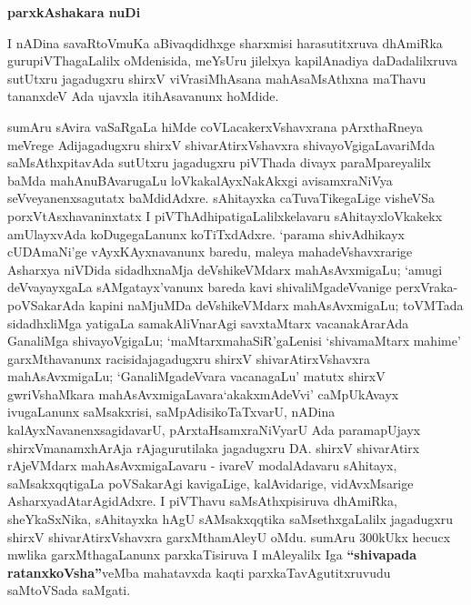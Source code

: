 \begin{center}
{\Huge\bfseries parxkAshakara nuDi}
\end{center}

\smallskip

I nADina savaRtoVmuKa aBivaqdidhxge sharxmisi harasutitxruva dhAmiRka gurupiVThagaLalilx oMdenisida, meYsUru jilelxya kapilA\-nadiya daDadalilxruva sutUtxru jagadugxru shirxV viVrasiMhAsana mahAsaMsAthxna maThavu tananxdeV Ada ujavxla itihAsavanunx hoMdide.

\smallskip

sumAru sAvira vaSaRgaLa hiMde coVLacakerxVshavxrana pArxthaRneya meVrege Adijagadugxru shirxV shivarAtirxVshavxra shivayoVgigaLavariMda saMsAthxpitavAda sutUtxru jagadugxru piVThada divayx paraMpareyalilx baMda mahAnuBAvarugaLu loVkakalAyxNakAkxgi avisamxraNiVya seVveyanenxsagutatx baMdidAdxre. sAhitayxka caTuvaTikegaLige visheVSa porxVtAsxhavaninxtatx I piVThAdhipatigaLalilx\break kelavaru sAhitayxloVkakekx amUlayxvAda koDugegaLanunx koTiTxdAdxre. `parama shivAdhikayx cUDAmaNi'ge vAyxKAyxnavanunx baredu, maleya mahadeVshavxrarige Asharxya niVDida sidadhxnaMja deVshikeVMdarx mahAsAvxmigaLu; `amugi deVvayayxgaLa sAMgatayx'vanunx bareda kavi shivaliMga\-deVvanige perxVraka-poVSakarAda kapini naMjuMDa deVshikeVMdarx mahAsAvxmigaLu; toVMTada sidadhxliMga yatigaLa samakAliVna\-rAgi savxtaMtarx vacana\-kAra\-rAda GanaliMga shivayoVgigaLu; `maMtarxmahaSiR'gaLenisi `shivamaMtarx mahime' garxMthavanunx racisida\break jagadugxru shirxV shivarAtirxVshavxra mahAsAvxmigaLu; `GanaliMgadeVvara vacanagaLu' matutx shirxV gwriVshaMkara mahAsAvxmigaLavara\break `akakxmAdeVvi' caMpUkAvayx ivugaLanunx saMsakxrisi, saMpAdisikoTaTxvarU, nADina kalAyxNavanenxsagidavarU, pArxtaHsamxraNiVyarU Ada paramapUjayx shirxVmanamxhArAja rAjagurutilaka jagadugxru DA. shirxV shivarAtirx rAjeVMdarx mahAsAvxmigaLavaru - ivareV modalAdavaru sAhitayx, saMsakxqqti\-gaLa poVSakarAgi kavigaLige, kalAvidarige, vidAvxMsarige AsharxyadAtarAgidAdxre. I piVThavu saMsAthxpisiruva dhAmiRka, sheYkaSxNika, sAhitayxka hAgU sAMsakxqqtika saMsethxgaLalilx jagadugxru shirxV shivarAtirxVshavxra garxMtha\-mAleyU oMdu. sumAru 300kUkx hecucx mwlika garxMthagaLanunx parxkaTisiruva I mAleyalilx Iga \textbf{``shivapada ratanxkoVsha''}veMba mahatavxda kaqti parxkaTavAgutitxruvudu saMtoVSada saMgati.

\smallskip

